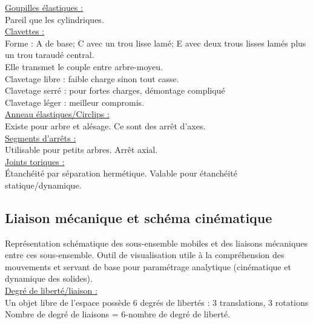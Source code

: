 \documentclass[../main.tex]{subfiles}
\begin{document}
\quad \underline{Goupilles élastiques :}\\
Pareil que les cylindriques.\\

\quad \underline{Clavettes :}\\
Forme : A de base; C avec un trou lisse lamé; E avec deux trous lisses lamés plus un trou taraudé central.\\
Elle transmet le couple entre arbre-moyeu. \\
Clavetage libre : faible charge sinon tout casse.\\
Clavetage serré : pour fortes charges, démontage compliqué\\
Clavetage léger : meilleur compromis.\\

\quad \underline{Anneau élastiques/Circlips :}\\
Existe pour arbre et alésage. Ce sont des arrêt d'axes.\\

\quad \underline{Segments d'arrêts :}\\
Utilisable pour petits arbres. Arrêt axial.\\

\quad \underline{Joints toriques :}\\
Étanchéité par séparation hermétique. Valable pour étanchéité statique/dynamique. \\

\subsection{Liaison mécanique et schéma cinématique}
Représentation schématique des sous-ensemble mobiles et des liaisons mécaniques entre ces sous-ensemble. Outil de visualisation utile à la compréhension des mouvements et servant de base pour paramétrage analytique (cinématique et dynamique des solides).\\

\quad \underline{Degré de liberté/liaison :}\\
Un objet libre de l'espace possède 6 degrés de libertés : 3 translations, 3 rotations\\
Nombre de degré de liaisons = 6-nombre de degré de liberté.\\
\end{document}
